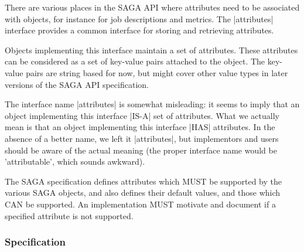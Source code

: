 
  There are various places in the SAGA API where attributes need to be
  associated with objects, for instance for job descriptions and
  metrics.  The |attributes| interface provides a common interface for
  storing and retrieving attributes.
 
  Objects implementing this interface maintain a set of
  attributes.  These attributes can be considered as a set of
  key-value pairs attached to the object.  The key-value pairs
  are string based for now, but might cover other value types in
  later versions of the SAGA API specification.
 
  The interface name |attributes| is somewhat misleading: it
  seems to imply that an object implementing this interface
  |IS-A| set of attributes.  What we actually mean is that an
  object implementing this interface |HAS| attributes.  
  In the absence of a better name,
  we left it |attributes|, but implementors
  and users should be aware of the actual meaning  (the
  proper interface name would be 'attributable', which sounds
  awkward).

 
  The SAGA specification defines attributes which MUST be supported by
  the various SAGA objects, and also defines their default values, and
  those which CAN be supported.  An implementation MUST motivate and
  document if a specified attribute is not supported.  
 
 
 \subsubsection{Specification}
 
